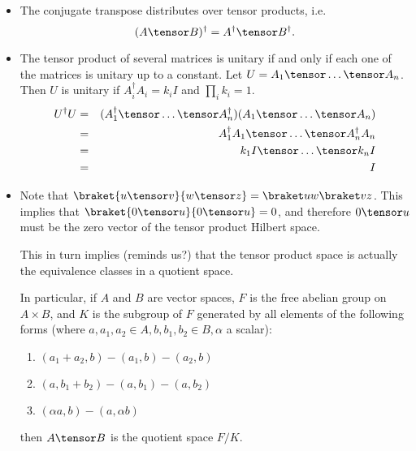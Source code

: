 \documentclass{slides}
\begin{document}
\begin{slide}{}
\begin{itemize}

	\item The conjugate transpose distributes over tensor products, i.e.
$$(A\tensor B)^\dag= A^\dag\tensor B^\dag.$$

	\item The tensor product of several matrices is unitary if and only if each one of the
matrices is unitary up to a constant.  Let $U = A_1\tensor \dots \tensor A_n$.  Then
$U$ is unitary if $A_i^\dag A_i = k_i I$ and $\prod_ik_i = 1$.
\begin{eqnarray*}U^\dag U &=& (A_1^\dag\tensor \dots \tensor A_n^\dag )(A_1\tensor \dots \tensor A_n)\\
&=& A_1^\dag A_1\tensor \dots \tensor A_n^\dag A_n\\
&=& k_1I\tensor \dots \tensor k_nI\\
&=& I\\
\end{eqnarray*}

\end{itemize}
\end{slide}

\begin{slide}{}
\begin{itemize}
	\item Note that $\braket {u \tensor v} {w \tensor z} = \braket uw \braket vz$.  
	This implies that $\braket {0 \tensor u} {0 \tensor u} = 0$, and therefore $0 \tensor u$ must
	be the zero vector of the tensor product Hilbert space.
	
	This in turn implies (reminds us?) that the tensor product space is actually the equivalence
	classes in a quotient space.
	
	In particular, if $A$ and $B$ are vector spaces, $F$ is the free abelian group on $A\times B$,
	and $K$ is the subgroup of $F$ generated by all elements of the following forms (where \newline	
	$a, a_1, a_2\in A, b, b_1, b_2\in B, \alpha$ a scalar):
	\begin{enumerate}
		\item $(a_1 + a_2,b) - (a_1,b) - (a_2,b)$
		\item $(a,b_1 + b_2) - (a,b_1) - (a,b_2)$
		\item $(\alpha a,b) - (a,\alpha b)$
	\end{enumerate}
	then $A\tensor B$ is the quotient space $F/K$.
	 
\end{itemize}

\end{slide}
\end{document}
